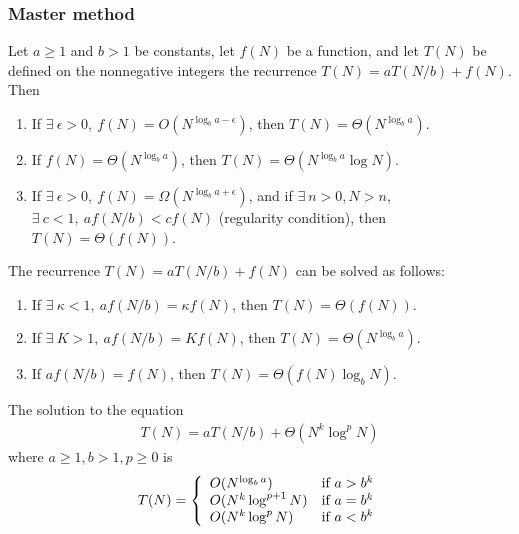 \subsubsection{Master method}
\begin{theorem}\quad 

    Let $a\ge 1$ and $b> 1$ be constants, let $f(N)$ be a function, and let $T(N)$ be defined on the nonnegative integers the recurrence $T(N)=aT(N/b)+f(N)$. Then
    \begin{enumerate}\small
        \item If $\exists\ \epsilon>0,\ f(N)=O(N^{\log_b a-\epsilon})$, then $T(N)=\Theta (N^{\log_b a})$.
        \item If $f(N)=\Theta(N^{\log_b a})$, then $T(N)=\Theta(N^{\log_b a}\log N)$. 
        \item If $\exists\ \epsilon>0,\ f(N)=\Omega(N^{\log_b a+\epsilon})$, and if $\exists\ n>0, N>n$, $\exists\ c<1,\ af(N/b)<cf(N)$ (regularity condition), then $T(N)=\Theta(f(N))$.
    \end{enumerate}
\end{theorem}


\begin{theorem}\quad 

    The recurrence $T(N)=aT(N/b)+f(N)$ can be solved as follows: 
    \begin{enumerate}\small
        \item If $\exists\ \kappa<1,\ af(N/b)=\kappa f(N)$, then $T(N)=\Theta(f(N))$. 
        \item If $\exists\ K>1,\ af(N/b)=Kf(N)$, then $T(N)=\Theta(N^{\log_b a})$. 
        \item If $af(N/b)=f(N)$, then $T(N)=\Theta(f(N)\log_b N)$. 
    \end{enumerate}
\end{theorem}

\begin{theorem}\quad

    The solution to the equation 
    \begin{align*}
        T(N)=aT(N/b)+\Theta(N^k\log^p N)
    \end{align*}
    where $a\ge 1, b>1, p\ge 0$ is 
    \begin{align*}
        T(N)=\left\{ \begin{array}[c]{ll}
            O(N^{\log_b a}) & \text{if }a>b^k \\
            O(N^k\log^{p+1}N)&\text{if }a=b^k\\
            O(N^k\log^p N)&\text{if }a<b^k
        \end{array} \right.
    \end{align*}
    
\end{theorem}